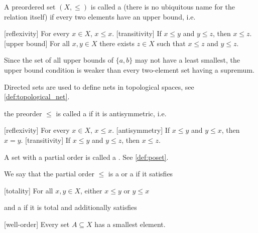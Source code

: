 \begin{definition}
\begin{defenum}
    \cite[8]{Engelking1989} A preordered set \( (X, \leq) \) is called a  (there is no ubiquitous name for the relation itself) if every two elements have an upper bound, i.e.
    \begin{description}
      [reflexivity] For every \( x \in X \), \( x \leq x \).
      [transitivity] If \( x \leq y \) and \( y \leq z \), then \( x \leq z \).
      [upper bound] For all \( x, y \in X \) there exists \( z \in X \) such that \( x \leq z \) and \( y \leq z \).
    \end{description}

    Since the set of all upper bounds of \( \{ a, b \} \) may not have a least smallest, the upper bound condition is weaker than every two-element set having a supremum.

    Directed sets are used to define nets in topological spaces, see \cref{def:topological_net}.

    \cite[7]{Engelking1989} the preorder \( \leq \) is called a  if it is antisymmetric, i.e.
    \begin{description}
      [reflexivity] For every \( x \in X \), \( x \leq x \).
      [antisymmetry] If \( x \leq y \) and \( y \leq x \), then \( x = y \).
      [transitivity] If \( x \leq y \) and \( y \leq z \), then \( x \leq z \).
    \end{description}

    A set with a partial order is called a . See \cref{def:poset}.

    We say that the partial order \( \leq \) is a  or a  if it satisfies
    \begin{description}
      [totality] For all \( x, y \in X \), either \( x \leq y \) or \( y \leq x \)
    \end{description}
    and a  if it is total and additionally satisfies
    \begin{description}
      [well-order] Every set \( A \subseteq X \) has a smallest element.
    \end{description}


\end{defenum}
\end{definition}
